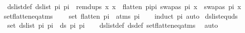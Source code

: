 \begin{isabellebody}
\ \ ds{\isacharunderscore}{\kern0pt}list{\isacharunderscore}{\kern0pt}def{\isacharcolon}{\kern0pt}\ {\isachardoublequoteopen}ds{\isacharunderscore}{\kern0pt}list\ pi{}\ pi{}\ {\isasymequiv}\ remdups\ {\isacharparenleft}{\kern0pt}{\isacharbrackleft}{\kern0pt}x{\isachardot}{\kern0pt}\ x\ {\isacharless}{\kern0pt}{\isacharminus}{\kern0pt}\ {\isacharparenleft}{\kern0pt}flatten\ {\isacharparenleft}{\kern0pt}pi{}{\isacharat}{\kern0pt}pi{}{\isacharparenright}{\kern0pt}{\isacharparenright}{\kern0pt}{\isacharcomma}{\kern0pt}\ swapas\ pi{}\ x\ {\isasymnoteq}\ swapas\ pi{}\ x{\isacharbrackright}{\kern0pt}{\isacharparenright}{\kern0pt}{\isachardoublequoteclose}\isanewline
\isanewline
{}\isamarkupfalse%
\ set{\isacharunderscore}{\kern0pt}flatten{\isacharunderscore}{\kern0pt}eq{\isacharunderscore}{\kern0pt}atms{\isacharcolon}{\kern0pt}\ \isanewline
\ \ \ {\isachardoublequoteopen}set\ {\isacharparenleft}{\kern0pt}flatten\ pi{\isacharparenright}{\kern0pt}\ {\isacharequal}{\kern0pt}\ atms\ pi{\isachardoublequoteclose}\isanewline
%
\isadelimproof
\ \ %
\endisadelimproof
%
\isatagproof
{}\isamarkupfalse%
\ {\isacharparenleft}{\kern0pt}induct\ pi{\isacharparenright}{\kern0pt}\ auto%
\endisatagproof
{\isafoldproof}%
%
\isadelimproof
\isanewline
%
\endisadelimproof
\isanewline
{}\isamarkupfalse%
\ ds{\isacharunderscore}{\kern0pt}list{\isacharunderscore}{\kern0pt}equ{\isacharunderscore}{\kern0pt}ds{\isacharcolon}{\kern0pt}\ \isanewline
\ \ {\isachardoublequoteopen}set\ {\isacharparenleft}{\kern0pt}ds{\isacharunderscore}{\kern0pt}list\ pi{}\ pi{}{\isacharparenright}{\kern0pt}\ {\isacharequal}{\kern0pt}\ ds\ pi{}\ pi{}{\isachardoublequoteclose}\isanewline
%
\isadelimproof
\ \ %
\endisadelimproof
%
\isatagproof
{}\isamarkupfalse%
\ ds{\isacharunderscore}{\kern0pt}list{\isacharunderscore}{\kern0pt}def\ ds{\isacharunderscore}{\kern0pt}def\ set{\isacharunderscore}{\kern0pt}flatten{\isacharunderscore}{\kern0pt}eq{\isacharunderscore}{\kern0pt}atms\ \isamarkupfalse%
\ auto%
\endisatagproof
{\isafoldproof}%
%
\isadelimproof
\isanewline
%
\endisadelimproof
\isanewline
%
\isadelimtheory
%
\endisadelimtheory
%
\isatagtheory
%
\endisatagtheory
{\isafoldtheory}%
%
\isadelimtheory
%
\endisadelimtheory
%
\end{isabellebody}%
\endinput
